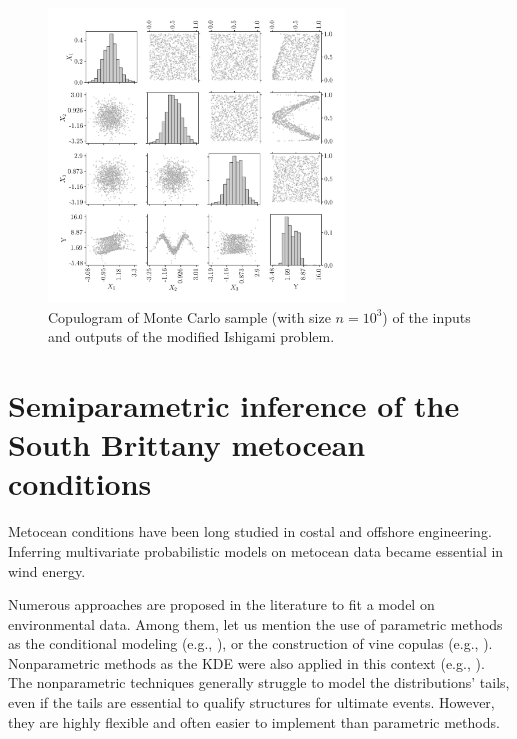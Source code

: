 \begin{figure}
    \centering
    \includegraphics[width=0.7\textwidth]{../numerical_experiments/chapter3/figures/ishigami_copluogram.png}
    \caption{Copulogram of Monte Carlo sample (with size $n=10^3$) of the inputs and outputs of the modified Ishigami problem.}
    \label{fig:ishigami_copulogram}
\end{figure}



\newpage
\section{Semiparametric inference of the South Brittany metocean conditions} \label{sec:32_inference}
Metocean conditions have been long studied in costal and offshore engineering. 
Inferring multivariate probabilistic models on metocean data became essential in wind energy. 

Numerous approaches are proposed in the literature to fit a model on environmental data. 
Among them, let us mention the use of parametric methods as the conditional modeling (e.g., \citealt{bitner_2015_joint,vanem_fekhari_2023}), or the construction of vine copulas (e.g., \citealt{vanem_2016,montes_2016_cvines_metocean,lin_2019_cvines_waves}). 
Nonparametric methods as the KDE were also applied in this context (e.g., \citealt{han_2018_kde_metocean}). 
The nonparametric techniques generally struggle to model the distributions' tails, even if the tails are essential to qualify structures for ultimate events. 
However, they are highly flexible and often easier to implement than parametric methods.

